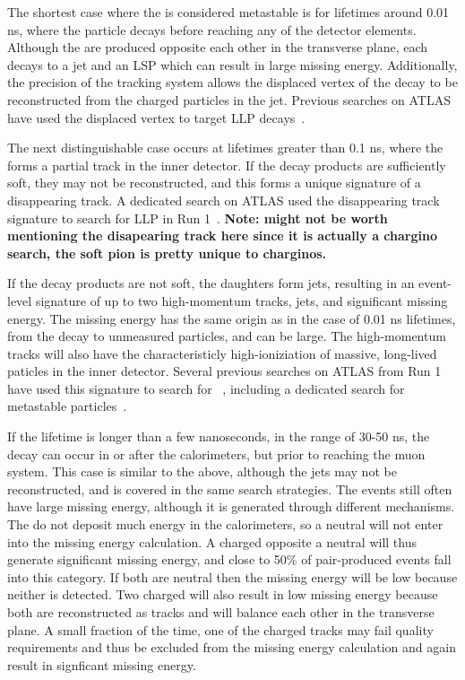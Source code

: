 The shortest case where the \rhadron is considered metastable is for lifetimes around 0.01 ns, where the particle decays before reaching any of the detector elements.
Although the \rhadrons are produced opposite each other in the transverse plane, each \rhadron decays to a jet and an \ac{LSP} which can result in large missing energy.
Additionally, the precision of the tracking system allows the displaced vertex of the \rhadron decay to be reconstructed from the charged particles in the jet.
Previous searches on \ac{ATLAS} have used the displaced vertex to target \ac{LLP} decays~\cite{SUSY-2014-02}.

The next distinguishable case occurs at lifetimes greater than 0.1 ns, where the \rhadron forms a partial track in the inner detector.
If the decay products are sufficiently soft, they may not be reconstructed, and this forms a unique signature of a disappearing track.
A dedicated search on \ac{ATLAS} used the disappearing track signature to search for \ac{LLP} in Run 1~\cite{SUSY-2013-01}.
\textbf{Note: might not be worth mentioning the disapearing track here since it is actually a chargino search, the soft pion is pretty unique to charginos.}

If the decay products are not soft, the \rhadron daughters form jets, resulting in an event-level signature of up to two high-momentum tracks, jets, and significant missing energy.
The missing energy has the same origin as in the case of 0.01 ns lifetimes, from the decay to unmeasured particles, and can be large.
The high-momentum tracks will also have the characteristicly high-ioniziation of massive, long-lived paticles in the inner detector.
Several previous searches on \ac{ATLAS} from Run 1 have used this signature to search for \rhadrons~\cite{SUSY-2012-01, SUSY-2013-22}, including a dedicated search for metastable particles~\cite{SUSY-2014-09}.

If the lifetime is longer than a few nanoseconds, in the range of 30-50 ns, the \rhadron decay can occur in or after the calorimeters, but prior to reaching the muon system.
This case is similar to the above, although the jets may not be reconstructed, and is covered in the same search strategies.
The events still often have large missing energy, although it is generated through different mechanisms.
The \rhadrons do not deposit much energy in the calorimeters, so a neutral \rhadron will not enter into the missing energy calculation.
A charged \rhadron opposite a neutral \rhadron will thus generate significant missing energy, and close to 50\% of pair-produced \rhadron events fall into this category.
If both \rhadrons are neutral then the missing energy will be low because neither is detected.
Two charged \rhadrons will also result in low missing energy because both are reconstructed as tracks and will balance each other in the transverse plane.
A small fraction of the time, one of the charged \rhadron tracks may fail quality requirements and thus be excluded from the missing energy calculation and again result in signficant missing energy.

